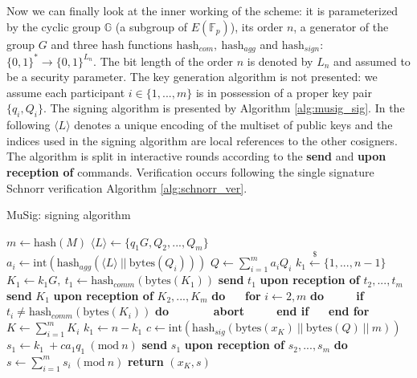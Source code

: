 \bigskip
\noindent
Now we can finally look at the inner working of the scheme: it is parameterized by the cyclic group $\mathbb{G}$ (a subgroup of $E(\mathbb{F}_p)$), its order $n$, a generator of the group $G$ and three hash functions $\text{hash}_{com}, \ \text{hash}_{agg}$ and $\text{hash}_{sign}$: $\{0, 1\}^* \to \{0, 1\}^{L_n}$. The bit length of the order $n$ is denoted by $L_n$ and assumed to be a security parameter. The key generation algorithm is not presented: we assume each participant $i \in \{1, ..., m\}$ is in possession of a proper key pair $\{q_i, Q_i\}$. The signing algorithm is presented by Algorithm \ref{alg:musig_sig}. In the following $\langle L \rangle$ denotes a unique encoding of the multiset of public keys and the indices used in the signing algorithm are local references to the other cosigners. The algorithm is split in interactive rounds according to the \textbf{send} and \textbf{upon reception of} commands. Verification occurs following the single signature Schnorr verification Algorithm \ref{alg:schnorr_ver}.

\bigskip

\begin{algorithm}
	\caption{MuSig: signing algorithm}
	\label{alg:musig_sig}
	\begin{algorithmic}[1]
		\State $m \gets \text{hash}(M)$
		\State $\langle L \rangle \gets \{q_1G, Q_2, ..., Q_m\}$
		\State $a_i \gets \text{int}(\text{hash}_{agg}(\langle L \rangle \ || \ \text{bytes}(Q_i)))$
		\EndFor
		\State $Q \gets \sum_{i = 1}^{m}a_iQ_i$
		\State $k_1 \xleftarrow{\text{\$}} \{1, ..., n - 1\}$
		\State $K_1 \gets k_1G, \ t_1 \gets \text{hash}_{comm}(\text{bytes}(K_1))$
		\State \textbf{send} $t_1$
		\State \textbf{upon reception of} $t_2, ..., t_m$ \textbf{send} $K_1$
		\State \textbf{upon reception of} $K_2, ..., K_m$ \textbf{do}
		\State $\ \ \ \ \ $ \textbf{for} $i \gets 2, m$ \textbf{do}
		\State $\ \ \ \ \ \ \ \ \ \ $ \textbf{if} $t_i \neq \text{hash}_{comm}(\text{bytes}(K_i))$ \textbf{do}
		\State $\ \ \ \ \ \ \ \ \ \ \ \ \ \ \ $ \textbf{abort}
		\State $\ \ \ \ \ \ \ \ \ \ $ \textbf{end if}
		\State $\ \ \ \ \ $ \textbf{end for} 
		\State $K \gets \sum_{i = 1}^{m}K_i$
		\State $k_1 \gets n - k_1$
		\EndIf
		\State $c \gets \text{int}(\text{hash}_{sig}(\text{bytes}(x_K) \ || \ \text{bytes}(Q) \ || \ m))$
		\State $s_1 \gets k_1\ + ca_1q_1 \ (\text{mod} \ n)$
		\State \textbf{send} $s_1$
		\State \textbf{upon reception of} $s_2, ..., s_m$ \textbf{do}
		\State $s \gets \sum_{i = 1}^{m}s_i \ (\text{mod} \ n)$
		\State \textbf{return} $(x_K, s)$
		\EndProcedure
	\end{algorithmic}
\end{algorithm}

